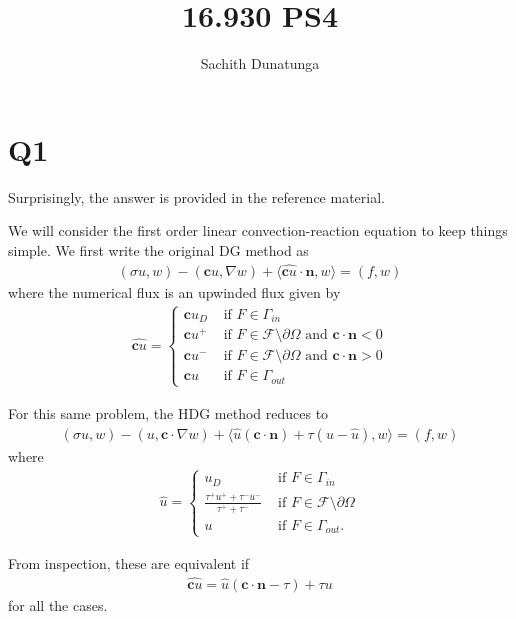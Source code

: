 \documentclass{article}
\begin{document}
\author{Sachith Dunatunga}
\title{16.930 PS4}
\maketitle

\section{Q1}
Surprisingly, the answer is provided in the reference material\cite{nguyen}.

We will consider the first order linear convection-reaction equation to keep things simple. We first write the original DG method as
\begin{align}
(\sigma u, w) - (\mathbf{c}u, \nabla w) + \langle \widehat{\mathbf{c}u} \cdot \mathbf{n}, w \rangle = (f, w)
\end{align}
where the numerical flux is an upwinded flux given by
\begin{align}
\widehat{\mathbf{c}u} = \begin{cases}
    \mathbf{c}u_D & \mbox{ if } F \in \Gamma_{in} \\
    \mathbf{c}u^+ & \mbox{ if } F \in \mathcal{F} \setminus \partial \Omega \mbox{ and } \mathbf{c} \cdot \mathbf{n} < 0 \\
    \mathbf{c}u^- & \mbox{ if } F \in \mathcal{F} \setminus \partial \Omega \mbox{ and } \mathbf{c} \cdot \mathbf{n}  > 0 \\
    \mathbf{c}u & \mbox{ if } F \in \Gamma_{out}
\end{cases}
\end{align}

For this same problem, the HDG method reduces to
\begin{align}
(\sigma u, w) -(u, \mathbf{c} \cdot \nabla w) + \langle \hat{u} (\mathbf{c} \cdot \mathbf{n}) + \tau (u - \hat{u}), w \rangle = (f, w)
\end{align}
where
\begin{align}
\hat{u} = \begin{cases}
    u_D & \mbox{ if } F \in \Gamma_{in} \\
   \frac{\tau^+ u^+ + \tau^- u^-}{\tau^+ + \tau^-} & \mbox{ if } F \in \mathcal{F} \setminus \partial \Omega \\
    u & \mbox{ if } F \in \Gamma_{out}.
\end{cases}
\end{align}

From inspection, these are equivalent if
\begin{align}
    \widehat{\mathbf{c}u} = \hat{u} (\mathbf{c} \cdot \mathbf{n} - \tau) + \tau u
\end{align}
for all the cases.
\end{document}
